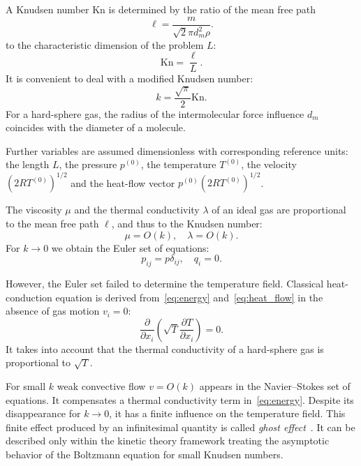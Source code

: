 \documentclass[smallextended, referee]{svjour3} %
\newcommand{\Kn}{\mathrm{Kn}}
\newcommand{\pder}[2][]{\frac{\partial#1}{\partial#2}}
\begin{document}
A Knudsen number \(\Kn\) is determined by the ratio of the mean free path
\begin{equation}\label{eq:ell}
	\ell = \frac{m}{\sqrt2\pi d_m^2 \rho}.
\end{equation}
to the characteristic dimension of the problem \(L\):
\begin{equation}\label{eq:Knudsen}
	\Kn = \frac{\ell}L.
\end{equation}
It is convenient to deal with a modified Knudsen number:
\begin{equation}
	k = \frac{\sqrt\pi}2\Kn.
\end{equation}
For a hard-sphere gas, the radius of the intermolecular force influence \(d_m\)
coincides with the diameter of a molecule.

Further variables are assumed dimensionless with corresponding reference units:
the length \(L\), the pressure \(p^{(0)}\), the temperature \(T^{(0)}\),
the velocity \((2RT^{(0)})^{1/2}\) and the heat-flow vector \(p^{(0)}(2RT^{(0)})^{1/2}\).

The viscosity \(\mu\) and the thermal conductivity \(\lambda\) of an ideal gas
are proportional to the mean free path \(\ell\), and thus to the Knudsen number:
\begin{equation}
	\mu = O(k), \quad \lambda = O(k).
\end{equation}
For \(k\to0\) we obtain the Euler set of equations:
\begin{equation}
	p_{ij} = p\delta_{ij}, \quad q_i = 0.
\end{equation}

However, the Euler set failed to determine the temperature field.
Classical heat-conduction equation is derived from~\eqref{eq:energy} and~\eqref{eq:heat_flow}
in the absence of gas motion \(v_i = 0\):
\begin{equation}\label{eq:heat_equation}
	\pder{x_i}\left(\sqrt{T}\pder[T]{x_i}\right) = 0.
\end{equation}
It takes into account that the thermal conductivity of a hard-sphere gas is proportional to \(\sqrt{T}\).

For small \(k\) weak convective flow \(v = O(k)\) appears in the Navier--Stokes set of equations.
It compensates a thermal conductivity term in~\eqref{eq:energy}.
Despite its disappearance for \(k\to0\), it has a finite influence on the temperature field.
This finite effect produced by an infinitesimal quantity is called \textit{ghost effect}~\cite{Sone2002}.
It can be described only within the kinetic theory framework treating the asymptotic behavior of
the Boltzmann equation for small Knudsen numbers.
\end{document}
